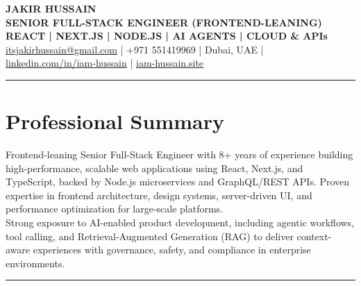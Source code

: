 \documentclass[10pt,a4paper]{article}
\newcommand{\NameSize}{\fontsize{22}{24}\selectfont}
\newcommand{\TitleSize}{\fontsize{10.8}{13}\selectfont}
\newcommand{\TagSize}{\fontsize{10}{12}\selectfont}
\newcommand{\BodySize}{\fontsize{9.7}{12}\selectfont}
\newcommand{\SmallBody}{\fontsize{9.2}{11.4}\selectfont}
\newcommand{\topdivider}{\color{rulecolor}\rule{\linewidth}{0.5pt}\color{primary}\vspace{0pt}}
\begin{document}
\BodySize

\begin{center}
{\NameSize \bfseries JAKIR HUSSAIN}\\[4pt]
{\TitleSize \bfseries SENIOR FULL-STACK ENGINEER (FRONTEND-LEANING)}\\[2pt]
{\TagSize \bfseries REACT \;|\; NEXT.JS \;|\; NODE.JS \;|\; AI AGENTS \;|\; CLOUD \& APIs}\\[6pt]

\href{mailto:itsjakirhussain@gmail.com}{itsjakirhussain@gmail.com} \;|\;
+971 551419969 \;|\;
Dubai, UAE \;|\;
\href{https://linkedin.com/in/iam-hussain}{linkedin.com/in/iam-hussain} \;|\;
\href{https://iam-hussain.site}{iam-hussain.site}

\end{center}
\vspace{-8pt}
\topdivider
\vspace{2pt}
\section*{Professional Summary}
\SmallBody
Frontend-leaning Senior Full-Stack Engineer with 8+ years of experience building high-performance, scalable web applications using React, Next.js, and TypeScript, backed by Node.js microservices and GraphQL/REST APIs. Proven expertise in frontend architecture, design systems, server-driven UI, and performance optimization for large-scale platforms.\\[5pt]
Strong exposure to AI-enabled product development, including agentic workflows, tool calling, and Retrieval-Augmented Generation (RAG) to deliver context-aware experiences with governance, safety, and compliance in enterprise environments.\\[8pt]

\vspace{-8pt}
\topdivider
\vspace{2pt}
\end{document}
